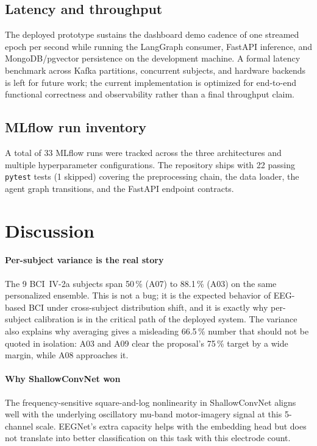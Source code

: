 \documentclass[conference]{IEEEtran}
\begin{document}
\subsection{Latency and throughput}

The deployed prototype sustains the dashboard demo cadence of one streamed
epoch per second while running the LangGraph consumer, FastAPI inference, and
MongoDB/pgvector persistence on the development machine. A formal latency
benchmark across Kafka partitions, concurrent subjects, and hardware backends
is left for future work; the current implementation is optimized for
end-to-end functional correctness and observability rather than a final
throughput claim.

\subsection{MLflow run inventory}

A total of 33 MLflow runs were tracked across the three architectures and
multiple hyperparameter configurations. The repository ships with 22
passing \texttt{pytest} tests (1 skipped) covering the preprocessing chain,
the data loader, the agent graph transitions, and the FastAPI endpoint
contracts.

\section{Discussion}

\paragraph{Per-subject variance is the real story} The 9 BCI~IV-2a subjects
span 50\,\% (A07) to 88.1\,\% (A03) on the same personalized ensemble. This
is not a bug; it is the expected behavior of EEG-based BCI under cross-subject
distribution shift, and it is exactly why per-subject calibration is in the
critical path of the deployed system. The variance also explains why averaging
gives a misleading 66.5\,\% number that should not be quoted in isolation:
A03 and A09 clear the proposal's 75\,\% target by a wide margin, while A08
approaches it.

\paragraph{Why ShallowConvNet won} The frequency-sensitive square-and-log
nonlinearity in ShallowConvNet aligns well with the underlying
oscillatory mu-band motor-imagery signal at this 5-channel scale. EEGNet's
extra capacity helps with the embedding head but does not translate into
better classification on this task with this electrode count.
\end{document}
